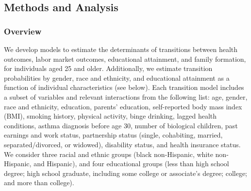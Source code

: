 \subsection{Methods and Analysis}





\subsubsection{Overview}
\label{section:FAM_models}

\noindent We develop models to estimate the determinants of transitions between health outcomes, labor market outcomes, educational attainment, and family formation, for individuals aged 25 and older.
Additionally, we estimate transition probabilities by gender, race and ethnicity, and educational attainment as a function of individual characteristics (see below).
Each transition model includes a subset of variables and relevant interactions from the following list: age, gender, race and ethnicity, education, parents' education, self-reported body mass index (BMI), smoking history, physical activity, binge drinking, lagged health conditions, asthma diagnosis before age 30, number of biological children, past earnings and work status, partnership status (single, cohabiting, married, separated/divorced, or widowed), disability status, and health insurance status.
We consider three racial and ethnic groups (black non-Hispanic, white non-Hispanic, and Hispanic), and four educational groups (less than high school degree; high school graduate, including some college or associate's degree; college; and more than college).

